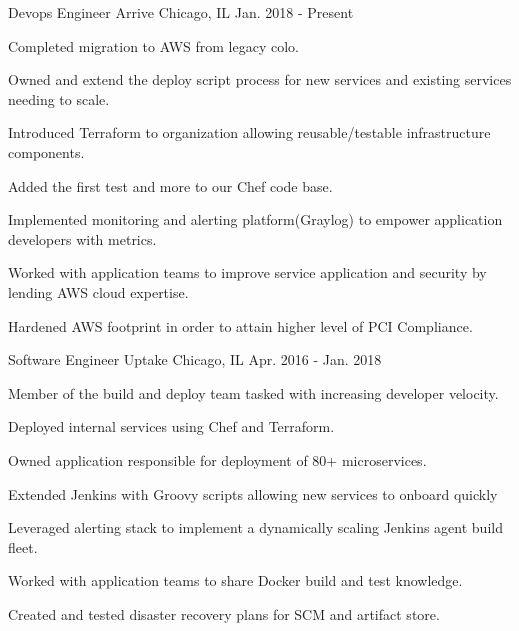 

\begin{cventries}

  \cventry
    {Devops Engineer} %
    {Arrive} %
    {Chicago, IL} %
    {Jan. 2018 - Present} %
    {
      \begin{cvitems}  %
        \item {Completed migration to AWS from legacy colo.}
        \item {Owned and extend the deploy script process for new services and existing services needing to scale.}
        \item {Introduced Terraform to organization allowing reusable/testable infrastructure components.}
        \item {Added the first test and more to our Chef code base.}
        \item {Implemented monitoring and alerting platform(Graylog) to empower application developers with metrics.}
        \item {Worked with application teams to improve service application and security by lending AWS cloud expertise.}
        \item {Hardened AWS footprint in order to attain higher level of PCI Compliance.}
      \end{cvitems}
    }

  \cventry
    {Software Engineer} %
    {Uptake} %
    {Chicago, IL} %
    {Apr. 2016 - Jan. 2018} %
    {
      \begin{cvitems} %
        \item {Member of the build and deploy team tasked with increasing developer velocity.}
        \item {Deployed internal services using Chef and Terraform.}
        \item {Owned application responsible for deployment of 80+ microservices.}
        \item {Extended Jenkins with Groovy scripts allowing new services to onboard quickly}
        \item {Leveraged alerting stack to implement a dynamically scaling Jenkins agent build fleet.}
        \item {Worked with application teams to share Docker build and test knowledge.}
        \item {Created and tested disaster recovery plans for SCM and artifact store.}
      \end{cvitems}
    }

\end{cventries}
